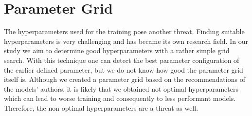 \section{Parameter Grid}
\label{chp:threats_to_validity:sec:parameter_grid}

The hyperparameters used for the training pose another threat.
Finding suitable hyperparameters is very challenging \parencite{Zeiler:2012} and has became its own research field.
In our study we aim to determine good hyperparameters with a rather simple grid search.
With this technique one can detect the best parameter configuration of the earlier defined parameter, but we do not know how good the parameter grid itself is.
Although we created a parameter grid based on the recommendations of the models' authors, it is likely that we obtained not optimal hyperparameters which can lead to worse training and consequently to less performant models.
Therefore, the non optimal hyperparameters are a threat as well.

